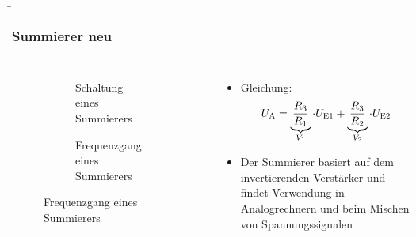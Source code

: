 \begin{frame}
    \b{
    \frametitle{Summierer neu}
    \begin{columns}
        \centering
        \begin{figure}
    \centering

    \begin{subfigure}{\linewidth}
        \centering
        \resizebox{0.6\linewidth}{!}{}
        \caption{Schaltung eines Summierers}
    \end{subfigure}

    \vspace{0.5cm} 

    \begin{subfigure}{\linewidth}
        \centering
        \resizebox{0.6\linewidth}{!}{}
        \caption{Frequenzgang eines Summierers}
    \end{subfigure}

\end{figure}

        \begin{itemize}
            \item Gleichung:
          \[
U_{\textnormal{A}} = \underbrace{\frac{R_3} {R_1}}_{V_1} \cdot U_{\textnormal{E1}} + \underbrace{\frac{R_3} {R_2}}_{V_2} \cdot U_{\textnormal{E2}}
\]
    \item Der Summierer basiert auf dem invertierenden Verstärker und findet Verwendung in Analogrechnern und beim Mischen von Spannungssignalen
        \end{itemize}
    \end{columns}
    }
\end{frame}


